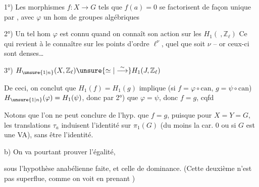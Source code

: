 1°) Les morphismes $f:X\longrightarrow G$ tels que $f(a)=0$ se factorisent de façon unique par
,
avec $\varphi$ un hom de groupes algébriques

2°)  Un tel hom $\varphi$ est connu quand on connaît son action sur les $H_1(\ ,\mathbb Z_\ell)$ Ce qui revient à le connaître sur les points d'ordre $\ell^\nu$, quel que soit $\nu$ -- or ceux-ci sont denses\ldots

3°) $H_{\unsure{1|n}}(X,\mathbb Z_\ell)\unsure{\simeq|\overset{\sim}{\longrightarrow}}H_1(J,\mathbb Z_\ell)$

De ceci,  on conclut  que $H_1(f)=H_1(g)$ implique (si $f=\varphi\circ\mathrm{can}$, $g=\psi\circ\mathrm{can}$) $H_{\unsure{1|n}}(\varphi)=H_1(\psi)$, donc par 2°) que $\varphi=\psi$, donc $f=g$, cqfd

 Notons que l'on ne peut conclure de l'hyp.  que $f=g$, puisque pour $X=Y=G$, les translations $\tau_a$ induisent l'identité sur $\pi_1(G)$ (du moins  la car. $0$ ou si $G$ est une VA), sans être l'identité.

b) On va pourtant prouver l'égalité,

sous l'hypothèse anabélienne faite, et celle de dominance. (Cette deuxième n'est pas superflue, comme on voit en prenant  )

